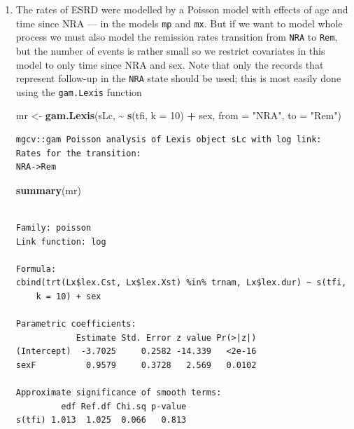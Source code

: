 \documentclass[
]{book}
\newenvironment{Shaded}{\begin{snugshade}}{\end{snugshade}}
\newcommand{\AttributeTok}[1]{\textcolor[rgb]{0.13,0.29,0.53}{#1}}
\newcommand{\DecValTok}[1]{\textcolor[rgb]{0.00,0.00,0.81}{#1}}
\newcommand{\FunctionTok}[1]{\textcolor[rgb]{0.13,0.29,0.53}{\textbf{#1}}}
\newcommand{\NormalTok}[1]{#1}
\newcommand{\OtherTok}[1]{\textcolor[rgb]{0.56,0.35,0.01}{#1}}
\newcommand{\SpecialCharTok}[1]{\textcolor[rgb]{0.81,0.36,0.00}{\textbf{#1}}}
\newcommand{\StringTok}[1]{\textcolor[rgb]{0.31,0.60,0.02}{#1}}
\begin{document}
\begin{enumerate}
\def\labelenumi{\arabic{enumi}.}
\setcounter{enumi}{16}
\item
  The rates of ESRD were modelled by a Poisson model with
  effects of age and time since NRA --- in the models \texttt{mp}
  and \texttt{mx}. But if we want to model whole process we must
  also model the remission rates transition from \texttt{NRA} to
  \texttt{Rem}, but the number of events is rather small so we restrict
  covariates in this model to only time since NRA and sex. Note
  that only the records that represent follow-up in the \texttt{NRA}
  state should be used; this is most easily done using the
  \texttt{gam.Lexis} function

\begin{Shaded}
\begin{Highlighting}[]
\NormalTok{mr }\OtherTok{\textless{}{-}} \FunctionTok{gam.Lexis}\NormalTok{(sLc, }\SpecialCharTok{\textasciitilde{}} \FunctionTok{s}\NormalTok{(tfi, }\AttributeTok{k =} \DecValTok{10}\NormalTok{) }\SpecialCharTok{+}\NormalTok{ sex,}
                     \AttributeTok{from =} \StringTok{"NRA"}\NormalTok{,}
                       \AttributeTok{to =} \StringTok{"Rem"}\NormalTok{)}
\end{Highlighting}
\end{Shaded}

\begin{verbatim}
mgcv::gam Poisson analysis of Lexis object sLc with log link:
Rates for the transition:
NRA->Rem
\end{verbatim}

\begin{Shaded}
\begin{Highlighting}[]
\FunctionTok{summary}\NormalTok{(mr)}
\end{Highlighting}
\end{Shaded}

\begin{verbatim}

Family: poisson 
Link function: log 

Formula:
cbind(trt(Lx$lex.Cst, Lx$lex.Xst) %in% trnam, Lx$lex.dur) ~ s(tfi, 
    k = 10) + sex

Parametric coefficients:
            Estimate Std. Error z value Pr(>|z|)
(Intercept)  -3.7025     0.2582 -14.339   <2e-16
sexF          0.9579     0.3728   2.569   0.0102

Approximate significance of smooth terms:
         edf Ref.df Chi.sq p-value
s(tfi) 1.013  1.025  0.066   0.813


\end{verbatim}
\end{enumerate}
\end{document}
